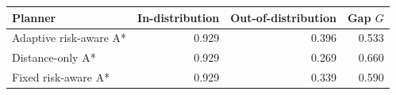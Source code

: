 \begin{tabular}{lrrr}
\toprule
Planner & In-distribution & Out-of-distribution & Gap $G$ \\
\midrule
Adaptive risk-aware A* & 0.929 & 0.396 & 0.533 \\
Distance-only A* & 0.929 & 0.269 & 0.660 \\
Fixed risk-aware A* & 0.929 & 0.339 & 0.590 \\
\bottomrule
\end{tabular}
